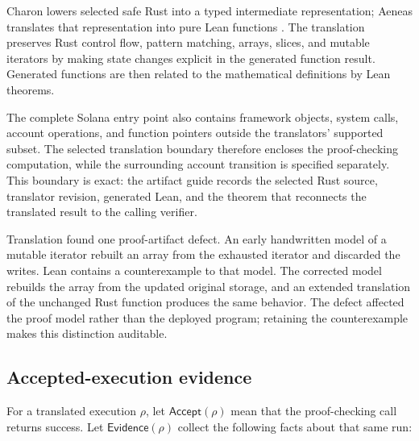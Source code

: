 Charon lowers selected safe Rust into a typed intermediate representation;
Aeneas translates that representation into pure Lean functions
\cite{HoEtAl2025Charon,HoProtzenko2022Aeneas}.  The translation preserves
Rust control flow, pattern matching, arrays, slices, and mutable iterators by
making state changes explicit in the generated function result.  Generated
functions are then related to the mathematical definitions by Lean theorems.

The complete Solana entry point also contains framework objects, system calls,
account operations, and function pointers outside the translators' supported
subset.  The selected translation boundary therefore encloses the
proof-checking computation, while the surrounding account transition is
specified separately.  This boundary is exact: the artifact guide records the
selected Rust source, translator revision, generated Lean, and the theorem
that reconnects the translated result to the calling verifier.

Translation found one proof-artifact defect.  An early handwritten model of a
mutable iterator rebuilt an array from the exhausted iterator and discarded
the writes.  Lean contains a counterexample to that model.  The corrected
model rebuilds the array from the updated original storage, and an extended
translation of the unchanged Rust function produces the same behavior.  The
defect affected the proof model rather than the deployed program; retaining
the counterexample makes this distinction auditable.

\subsection{Accepted-execution evidence}

For a translated execution \(\rho\), let \(\mathsf{Accept}(\rho)\) mean that
the proof-checking call returns success.  Let \(\mathsf{Evidence}(\rho)\)
collect the following facts about that same run:

